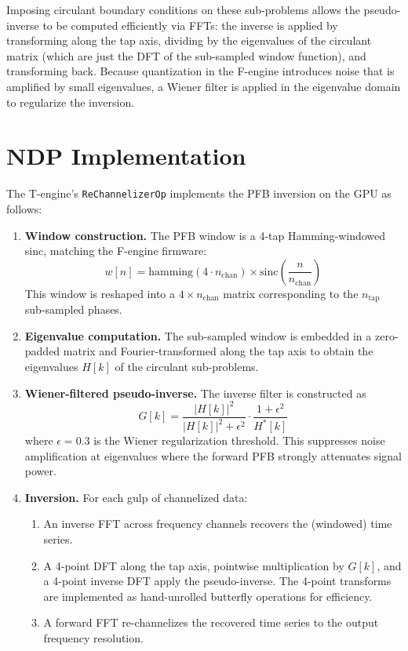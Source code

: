 Imposing circulant boundary conditions on these sub-problems allows the pseudo-inverse to be computed efficiently via FFTs: the inverse is applied by transforming along the tap axis, dividing by the eigenvalues of the circulant matrix (which are just the DFT of the sub-sampled window function), and transforming back.  Because quantization in the F-engine introduces noise that is amplified by small eigenvalues, a Wiener filter is applied in the eigenvalue domain to regularize the inversion.

\section{NDP Implementation}

The T-engine's \texttt{ReChannelizerOp} implements the PFB inversion on the GPU as follows:

\begin{enumerate}
    \item \textbf{Window construction.}  The PFB window is a 4-tap Hamming-windowed sinc, matching the F-engine firmware:
    \begin{equation}
        w[n] = \mathrm{hamming}(4 \cdot n_\mathrm{chan}) \times \mathrm{sinc}\!\left(\frac{n}{n_\mathrm{chan}}\right)
    \end{equation}
    This window is reshaped into a $4 \times n_\mathrm{chan}$ matrix corresponding to the $n_\mathrm{tap}$ sub-sampled phases.

    \item \textbf{Eigenvalue computation.}  The sub-sampled window is embedded in a zero-padded matrix and Fourier-transformed along the tap axis to obtain the eigenvalues $H[k]$ of the circulant sub-problems.

    \item \textbf{Wiener-filtered pseudo-inverse.}  The inverse filter is constructed as
    \begin{equation}
        G[k] = \frac{|H[k]|^2}{|H[k]|^2 + \epsilon^2} \cdot \frac{1 + \epsilon^2}{H^*[k]}
        \label{eq:wiener}
    \end{equation}
    where $\epsilon = 0.3$ is the Wiener regularization threshold.  This suppresses noise amplification at eigenvalues where the forward PFB strongly attenuates signal power.

    \item \textbf{Inversion.}  For each gulp of channelized data:
    \begin{enumerate}
        \item An inverse FFT across frequency channels recovers the (windowed) time series.
        \item A 4-point DFT along the tap axis, pointwise multiplication by $G[k]$, and a 4-point inverse DFT apply the pseudo-inverse.  The 4-point transforms are implemented as hand-unrolled butterfly operations for efficiency.
        \item A forward FFT re-channelizes the recovered time series to the output frequency resolution.
    \end{enumerate}
\end{enumerate}

